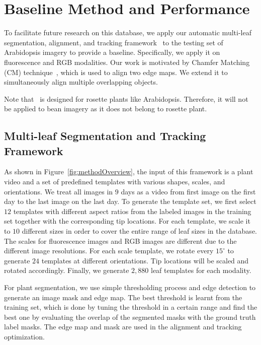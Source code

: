 \section{Baseline Method and Performance}
\label{sec:baseline}

To facilitate future research on this database, we apply our automatic multi-leaf segmentation, alignment, and tracking framework~\cite{yin2014a,yin2014b} to the testing set of Arabidopsis imagery to provide a baseline.
Specifically, we apply it on fluorescence and RGB modalities. 
Our work is motivated by Chamfer Matching (CM) technique~\cite{barrow1977parametric}, which is used to align two edge maps.
We extend it to simultaneously align multiple overlapping objects.

Note that~\cite{yin2014a,yin2014b} is designed for rosette plants like Arabidopsis.
Therefore, it will not be applied to bean imagery as it does not belong to rosette plant.

\subsection{Multi-leaf Segmentation and Tracking Framework}
As shown in Figure~\ref{fig:methodOverview}, the input of this framework is a plant video and a set of predefined templates with various shapes, scales, and orientations.
We treat all images in $9$ days as a video from first image on the first day to the last image on the last day.
To generate the template set, we first select $12$ templates with different aspect ratios from the labeled images in the training set together with the corresponding tip locations.
For each template, we scale it to $10$ different sizes in order to cover the entire range of leaf sizes in the database.
The scales for fluorescence images and RGB images are different due to the different image resolutions. 
For each scale template, we rotate every $15^{\circ}$ to generate $24$ templates at different orientations.
Tip locations will be scaled and rotated accordingly.
Finally, we generate $2,880$ leaf templates for each modality. 


For plant segmentation, we use simple thresholding process and edge detection to generate an image mask and edge map.
The best threshold is learnt from the training set, which is done by tuning the threshold in a certain range and find the best one by evaluating the overlap of the segmented masks with the ground truth label masks.
The edge map and mask are used in the alignment and tracking optimization.

